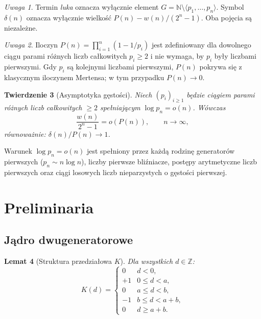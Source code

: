 \documentclass[11pt,a4paper]{amsart}
\theoremstyle{plain}
\newtheorem{theorem}{Twierdzenie}[section]
\newtheorem{lemma}[theorem]{Lemat}
\theoremstyle{definition}
\theoremstyle{remark}
\newtheorem{remark}[theorem]{Uwaga}
\begin{document}
\begin{remark}
\label{rem:terminology}
Termin \emph{luka} oznacza wyłącznie element
$G = \mathbb{N} \setminus \langle p_1,\ldots,p_n \rangle$.
Symbol $\delta(n)$ oznacza wyłącznie wielkość $P(n) - w(n)/(2^n-1)$.
Oba pojęcia są niezależne.
\end{remark}

\begin{remark}
\label{rem:mertens}
Iloczyn $P(n) = \prod_{i=1}^n (1 - 1/p_i)$ jest zdefiniowany
dla dowolnego ciągu parami różnych liczb całkowitych $p_i \geq 2$
i nie wymaga, by $p_i$ były liczbami pierwszymi.
Gdy $p_i$ są kolejnymi liczbami pierwszymi, $P(n)$ pokrywa się
z klasycznym iloczynem Mertensa; w tym przypadku $P(n) \to 0$.
\end{remark}

\begin{theorem}[Asymptotyka gęstości]
\label{thm:density}
Niech $(p_i)_{i \geq 1}$ będzie ciągiem parami różnych
liczb całkowitych $\geq 2$ spełniającym $\log p_n = o(n)$.
Wówczas
\[
  \frac{w(n)}{2^n - 1} = o(P(n)), \qquad n \to \infty,
\]
równoważnie: $\delta(n)/P(n) \to 1$.
\end{theorem}

Warunek $\log p_n = o(n)$ jest spełniony przez każdą rodzinę
generatorów pierwszych ($p_n \sim n \log n$), liczby pierwsze
bliźniacze, postępy arytmetyczne liczb pierwszych oraz ciągi
losowych liczb nieparzystych o gęstości pierwszej.

\section{Preliminaria}
\label{sec:prelim}

\subsection*{Jądro dwugeneratorowe}

\begin{lemma}[Struktura przedziałowa $K$]
\label{lem:K-intervals}
Dla wszystkich $d \in \mathbb{Z}$:
\[
  K(d) =
  \begin{cases}
     0  & d < 0,            \\
    +1  & 0 \leq d < a,     \\
     0  & a \leq d < b,     \\
    -1  & b \leq d < a+b,   \\
     0  & d \geq a+b.
  \end{cases}
\]
\end{lemma}
\end{document}
